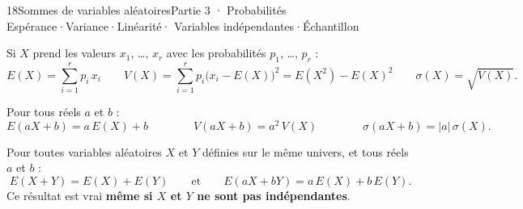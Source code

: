 
\begin{ouverture}[sommes]{18}{Sommes de variables aléatoires}{Partie 3 · Probabilités}
  {Espérance\enspace·\enspace Variance\enspace·\enspace Linéarité\enspace·\enspace
   Variables indépendantes\enspace·\enspace Échantillon}
\end{ouverture}

\essentiel


\begin{definition}
Si $X$ prend les valeurs $x_1$, \dots, $x_r$ avec les probabilités $p_1$, \dots, $p_r$ :
\[ E(X)=\sum_{i=1}^{r}p_i\,x_i\qquad V(X)=\sum_{i=1}^{r}p_i\big(x_i-E(X)\big)^{2}=E\left(X^{2}\right)-E(X)^{2}\qquad\sigma(X)=\sqrt{V(X)}. \]
\end{definition}

\begin{propriete}
Pour tous réels $a$ et $b$ :
\[ E(aX+b)=a\,E(X)+b\qquad\qquad V(aX+b)=a^{2}\,V(X)\qquad\qquad\sigma(aX+b)=|a|\,\sigma(X). \]
\end{propriete}


\begin{theoreme}
Pour toutes variables aléatoires $X$ et $Y$ définies sur le même univers, et tous réels $a$ et $b$ :
\[ E(X+Y)=E(X)+E(Y)\qquad\text{et}\qquad E(aX+bY)=a\,E(X)+b\,E(Y). \]
Ce résultat est vrai \textbf{même si $X$ et $Y$ ne sont pas indépendantes}.
\end{theoreme}

